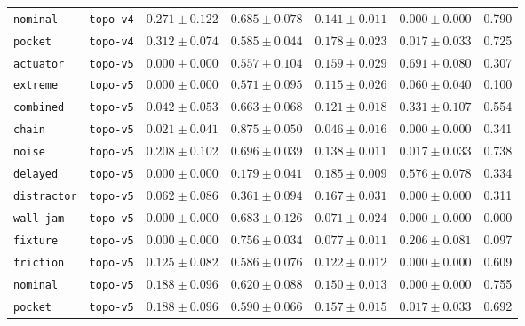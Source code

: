 \documentclass{article}
\begin{document}
\begin{center}
\begin{tabular}{llccccc}
\texttt{nominal} & \texttt{topo-v4} & $0.271 \pm 0.122$ & $0.685 \pm 0.078$ & $0.141 \pm 0.011$ & $0.000 \pm 0.000$ & 0.790 \\
\texttt{pocket} & \texttt{topo-v4} & $0.312 \pm 0.074$ & $0.585 \pm 0.044$ & $0.178 \pm 0.023$ & $0.017 \pm 0.033$ & 0.725 \\
\texttt{actuator} & \texttt{topo-v5} & $0.000 \pm 0.000$ & $0.557 \pm 0.104$ & $0.159 \pm 0.029$ & $0.691 \pm 0.080$ & 0.307 \\
\texttt{extreme} & \texttt{topo-v5} & $0.000 \pm 0.000$ & $0.571 \pm 0.095$ & $0.115 \pm 0.026$ & $0.060 \pm 0.040$ & 0.100 \\
\texttt{combined} & \texttt{topo-v5} & $0.042 \pm 0.053$ & $0.663 \pm 0.068$ & $0.121 \pm 0.018$ & $0.331 \pm 0.107$ & 0.554 \\
\texttt{chain} & \texttt{topo-v5} & $0.021 \pm 0.041$ & $0.875 \pm 0.050$ & $0.046 \pm 0.016$ & $0.000 \pm 0.000$ & 0.341 \\
\texttt{noise} & \texttt{topo-v5} & $0.208 \pm 0.102$ & $0.696 \pm 0.039$ & $0.138 \pm 0.011$ & $0.017 \pm 0.033$ & 0.738 \\
\texttt{delayed} & \texttt{topo-v5} & $0.000 \pm 0.000$ & $0.179 \pm 0.041$ & $0.185 \pm 0.009$ & $0.576 \pm 0.078$ & 0.334 \\
\texttt{distractor} & \texttt{topo-v5} & $0.062 \pm 0.086$ & $0.361 \pm 0.094$ & $0.167 \pm 0.031$ & $0.000 \pm 0.000$ & 0.311 \\
\texttt{wall-jam} & \texttt{topo-v5} & $0.000 \pm 0.000$ & $0.683 \pm 0.126$ & $0.071 \pm 0.024$ & $0.000 \pm 0.000$ & 0.000 \\
\texttt{fixture} & \texttt{topo-v5} & $0.000 \pm 0.000$ & $0.756 \pm 0.034$ & $0.077 \pm 0.011$ & $0.206 \pm 0.081$ & 0.097 \\
\texttt{friction} & \texttt{topo-v5} & $0.125 \pm 0.082$ & $0.586 \pm 0.076$ & $0.122 \pm 0.012$ & $0.000 \pm 0.000$ & 0.609 \\
\texttt{nominal} & \texttt{topo-v5} & $0.188 \pm 0.096$ & $0.620 \pm 0.088$ & $0.150 \pm 0.013$ & $0.000 \pm 0.000$ & 0.755 \\
\texttt{pocket} & \texttt{topo-v5} & $0.188 \pm 0.096$ & $0.590 \pm 0.066$ & $0.157 \pm 0.015$ & $0.017 \pm 0.033$ & 0.692 \\
\bottomrule
\end{tabular}
\end{center}
\normalsize
\end{document}
